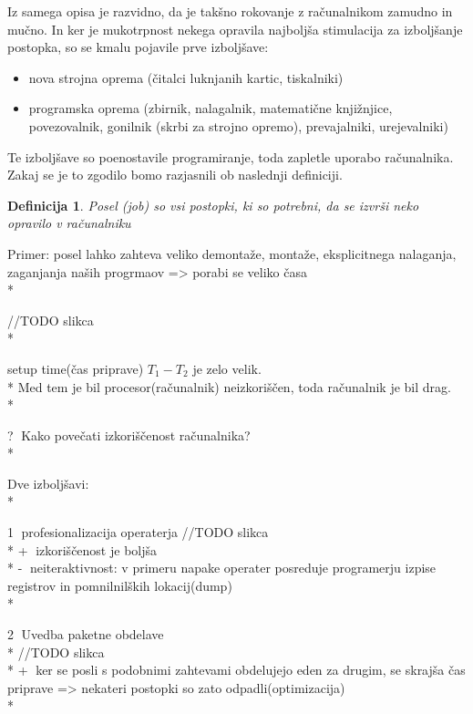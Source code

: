 \documentclass[
  slovene,
  a4paper
]{book}
\newtheorem*{df}{Definicija}
\begin{document}
Iz samega opisa je razvidno, da je takšno rokovanje z računalnikom zamudno in mučno. In ker je mukotrpnost nekega opravila najboljša stimulacija za izboljšanje postopka, so se kmalu pojavile prve izboljšave:
\begin{itemize}
  \item nova strojna oprema (čitalci luknjanih kartic, tiskalniki)
  \item programska oprema (zbirnik, nalagalnik, matematične knjižnjice, povezovalnik, gonilnik (skrbi za strojno opremo), prevajalniki, urejevalniki)
\end{itemize}

Te izboljšave so poenostavile programiranje, toda zapletle uporabo računalnika. Zakaj se je to zgodilo bomo razjasnili ob naslednji definiciji.

\begin{df}
  Posel (job) so vsi postopki, ki so potrebni, da se izvrši neko opravilo v računalniku
\end{df}

Primer: posel lahko zahteva veliko demontaže, montaže, eksplicitnega nalaganja, zaganjanja naših progrmaov => porabi se veliko časa\\*

//TODO slikca\\*

setup time(čas priprave)
\begin{math}
  T_1 - T_2
\end{math}
je zelo velik.\\*
Med tem je bil procesor(računalnik) neizkoriščen, toda računalnik je bil drag.\\*

\textcircled{?} Kako povečati izkoriščenost računalnika?\\*

Dve izboljšavi:\\*

\textcircled{1} profesionalizacija operaterja
//TODO slikca\\*
\textcircled{+} izkoriščenost je boljša\\*
\textcircled{-} neiteraktivnost: v primeru napake operater posreduje programerju izpise registrov in pomnilnilških lokacij(dump)\\*

\textcircled{2} Uvedba paketne obdelave\\*
//TODO slikca\\*
\textcircled{+} ker se posli s podobnimi zahtevami obdelujejo eden za drugim, se skrajša čas priprave => nekateri postopki so zato odpadli(optimizacija)\\*
\end{document}
